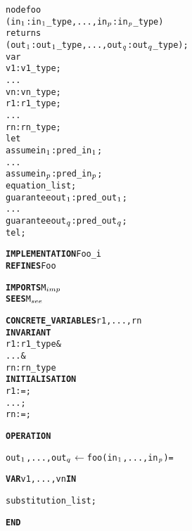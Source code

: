 \setlength{\columnseprule}{0.05cm}
\begin{multicols}{2}
\begin{alltt}
node foo 
  (in\(\sb{1}\): in\(\sb{1}\)\_type, ..., in\(\sb{p}\): in\(\sb{p}\)\_type) 
  returns 
  (out\(\sb{1}\): out\(\sb{1}\)\_type, ..., out\(\sb{q}\): out\(\sb{q}\)\_type);
var
  v1 : v1\_type;
  ...
  vn : vn\_type;
  r1 : r1\_type;
  ...
  rn : rn\_type;
let
  assume in\(\sb{1}\) : pred\_in\(\sb{1}\);
  ...
  assume in\(\sb{p}\) : pred\_in\(\sb{p}\);
  equation\_list;
  guarantee out\(\sb{1}\) : pred\_out\(\sb{1}\);
  ...
  guarantee out\(\sb{q}\) : pred\_out\(\sb{q}\);
tel;
\end{alltt}

\columnbreak

\begin{alltt}
\textbf{IMPLEMENTATION} Foo_i
\textbf{REFINES} Foo

\textbf{IMPORTS} M\(\sb{imp}\)
\textbf{SEES} M\(\sb{see}\)

\textbf{CONCRETE\_VARIABLES} r1, ..., rn
\textbf{INVARIANT}
  r1 : r1\_type &
  ... &
  rn : rn\_type
\textbf{INITIALISATION}
  r1 := ;
  ... ;
  rn := ;

\textbf{OPERATION}

out\(\sb{1}\), ..., out\(\sb{q}\) \(\leftarrow\) foo(in\(\sb{1}\), ..., in\(\sb{p}\)) =
  
\textbf{VAR} v1, ..., vn \textbf{IN}
  
  substitution\_list;

\textbf{END}
\end{alltt}
\end{multicols}




